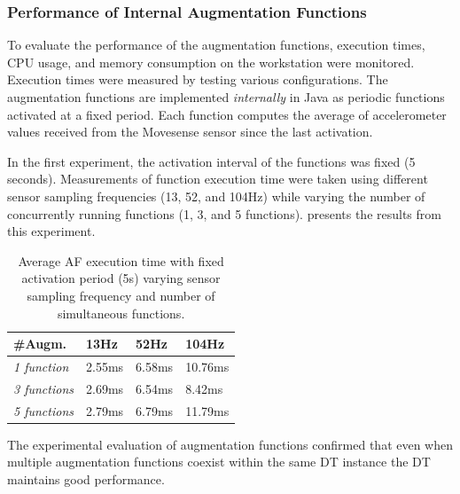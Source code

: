 \subsubsection{Performance of Internal Augmentation Functions}

To evaluate the performance of the augmentation functions, execution times, CPU usage, and memory consumption on the workstation were monitored.
%
Execution times were measured by testing various configurations.
The augmentation functions are implemented \emph{internally} in Java as periodic functions activated at a fixed period.
Each function computes the average of accelerometer values received from the Movesense sensor since the last activation.

In the first experiment, the activation interval of the functions was fixed (5 seconds).
Measurements of function execution time were taken using different sensor sampling frequencies (13, 52, and 104Hz) while varying the number of concurrently running functions (1, 3, and 5 functions).
%
 presents the results from this experiment.
%
\begin{table}

    \centering
    \begin{tabular}{p{4cm} p{2cm} p{2cm} p{2cm}}
    \hline
    \textbf{\#Augm.} & \textbf{13Hz} & \textbf{52Hz} & \textbf{104Hz} \\ \hline
    \textit{1 function} & 2.55ms & 6.58ms & 10.76ms \\ \hline
    \textit{3 functions} & 2.69ms & 6.54ms & 8.42ms \\ \hline
    \textit{5 functions} & 2.79ms & 6.79ms & 11.79ms \\ \hline\hline
    \end{tabular}
    \caption{Average AF execution time with fixed activation period (5s) varying sensor sampling frequency and number of simultaneous functions.}
    \label{tab:AF_exec_time_fixed_act_period}
\end{table}
%
The experimental evaluation of augmentation functions confirmed that even when multiple augmentation functions coexist within the same DT instance the \ac{DT} maintains good performance.

